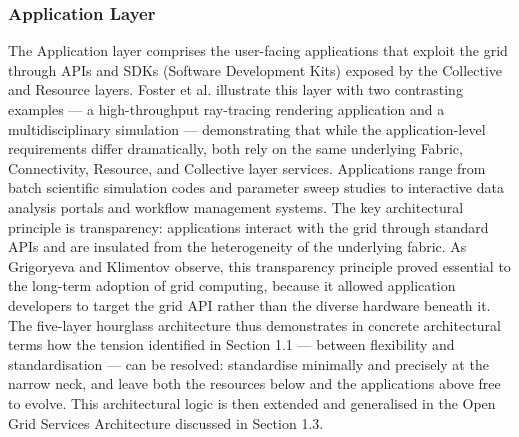 \documentclass[12pt,a4paper]{report}
\begin{document}
        \subsubsection*{Application Layer}
        The Application layer comprises the user-facing applications that exploit the grid through APIs and SDKs (Software Development Kits) 
        exposed by the Collective and Resource layers. Foster et al. \parencite{foster2001} illustrate this layer with two contrasting examples — a high-throughput 
        ray-tracing rendering application and a multidisciplinary simulation — demonstrating that while the application-level requirements differ
         dramatically, both rely on the same underlying Fabric, Connectivity, Resource, and Collective layer services. Applications range from batch 
         scientific simulation codes and parameter sweep studies to interactive data analysis portals and workflow management systems. The key 
         architectural principle is transparency: applications interact with the grid through standard APIs and are insulated from the heterogeneity 
         of the underlying fabric. As Grigoryeva and Klimentov \parencite{grigoryeva2024} observe, this transparency principle proved essential to the long-term adoption 
         of grid computing, because it allowed application developers to target the grid API rather than the diverse hardware beneath it. The five-layer 
         hourglass architecture thus demonstrates in concrete architectural terms how the tension identified in Section 1.1 — between flexibility and 
         standardisation — can be resolved: standardise minimally and precisely at the narrow neck, and leave both the resources below and the
          applications above free to evolve. This architectural logic is then extended and generalised in the Open Grid Services Architecture 
          discussed in Section 1.3.
\end{document}

